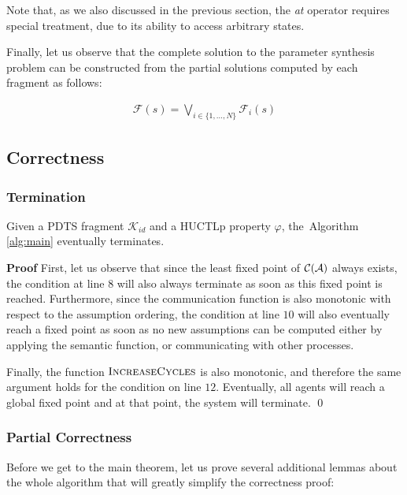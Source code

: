Note that, as we also discussed in the previous section, the \emph{at} operator requires special treatment, due to its ability to access arbitrary states.

Finally, let us observe that the complete solution to the parameter synthesis problem can be constructed from the partial solutions computed by each fragment as follows:

\begin{align*}
	\mathcal{F}(s) = \bigvee_{i \in \{1, \ldots, N \}} \mathcal{F}_i(s)
\end{align*}

\subsection{Correctness}

\subsubsection{\textbf{Termination}}

\begin{theorem} 
	Given a \ac{PDTS} fragment $\mathcal{K}_{id}$ and a \ac{HUCTLp} property $\varphi$, the~Algorithm \ref{alg:main} eventually terminates.
\end{theorem}

\textbf{Proof} First, let us observe that since the least fixed point of $\mathcal{C}(\mathcal{A})$ always exists, the condition at line $8$ will also always terminate as soon as this fixed point is reached. Furthermore, since the communication function is also monotonic with respect to the assumption ordering, the condition at line $10$ will also eventually reach a fixed point as soon as no new assumptions can be computed either by applying the semantic function, or communicating with other processes.

Finally, the function $\textsc{IncreaseCycles}$ is also monotonic, and therefore the same argument holds for the condition on line $12$. Eventually, all agents will reach a global fixed point and at that point, the system will terminate. \qed

\subsubsection{\textbf{Partial Correctness}}

Before we get to the main theorem, let us prove several additional lemmas about the whole algorithm that will greatly simplify the correctness proof:

